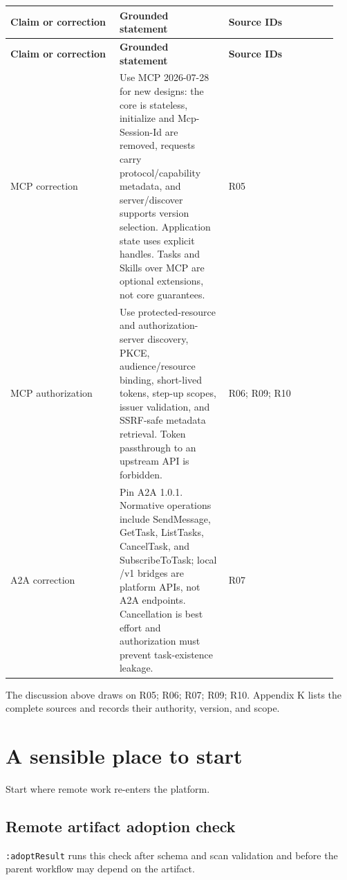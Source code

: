 \BookTableStart
\small
\begin{longtable}{@{}Y{0.3133\linewidth}Y{0.3133\linewidth}Y{0.3133\linewidth}@{}}
\color{white}\bfseries \textbf{Claim or correction} & \color{white}\bfseries \textbf{Grounded statement} & \color{white}\bfseries \textbf{Source IDs} \\
\endfirsthead
{}
\color{white}\bfseries \textbf{Claim or correction} & \color{white}\bfseries \textbf{Grounded statement} & \color{white}\bfseries \textbf{Source IDs} \\
\endhead
MCP correction & Use MCP 2026-07-28 for new designs: the core is stateless, initialize and Mcp-Session-Id are removed, requests carry protocol/capability metadata, and server/discover supports version selection. Application state uses explicit handles. Tasks and Skills over MCP are optional extensions, not core guarantees. & R05 \\
MCP authorization & Use protected-resource and authorization-server discovery, PKCE, audience/resource binding, short-lived tokens, step-up scopes, issuer validation, and SSRF-safe metadata retrieval. Token passthrough to an upstream API is forbidden. & R06; R09; R10 \\
A2A correction & Pin A2A 1.0.1. Normative operations include SendMessage, GetTask, ListTasks, CancelTask, and SubscribeToTask; local /v1 bridges are platform APIs, not A2A endpoints. Cancellation is best effort and authorization must prevent task-existence leakage. & R07 \\
\end{longtable}
\BookTableEnd

The discussion above draws on R05; R06; R07; R09; R10. Appendix K lists the complete sources and records their authority, version, and scope.\par

\section{A sensible place to start}

Start where remote work re-enters the platform.\par

\subsection{Remote artifact adoption check}

\lstinline[style=bookinline]!:adoptResult! runs this check after schema and scan validation and before the parent workflow may depend on the artifact.\par

